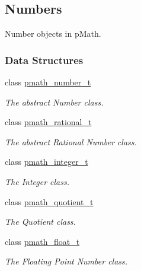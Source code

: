 \hypertarget{group__numbers}{
\subsection{Numbers}
\label{group__numbers}
}
Number objects in pMath.  


\subsubsection*{Data Structures}
\begin{CompactItemize}
\item 
class \hyperlink{classpmath__number__t}{pmath\_\-number\_\-t}
\begin{CompactList}\small\item\em The abstract Number class. \item\end{CompactList}\item 
class \hyperlink{classpmath__rational__t}{pmath\_\-rational\_\-t}
\begin{CompactList}\small\item\em The abstract Rational Number class. \item\end{CompactList}\item 
class \hyperlink{classpmath__integer__t}{pmath\_\-integer\_\-t}
\begin{CompactList}\small\item\em The Integer class. \item\end{CompactList}\item 
class \hyperlink{classpmath__quotient__t}{pmath\_\-quotient\_\-t}
\begin{CompactList}\small\item\em The Quotient class. \item\end{CompactList}\item 
class \hyperlink{classpmath__float__t}{pmath\_\-float\_\-t}
\begin{CompactList}\small\item\em The Floating Point Number class. \item\end{CompactList}\end{CompactItemize}
